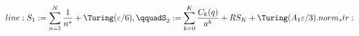 \documentclass[12pt]{article}
\begin{document}
\makeatletter
\renewcommand*{\@textcolor}[3]{%
  \protect\leavevmode
  \begingroup
    \color#1{#2}#3%
  \endgroup
}
\makeatother
\begin{displaymath}
\mathcolor[RGB]{0,0,15}{line:
S_1:=\sum_{n=1}^N\frac{1}{n^s}+\Turing(\varepsilon/6),\qquadS_2:=\sum_{k=0}^K} \mathcolor[RGB]{0,0,30}{\frac{C_k(q)}{a^k}+RS_K+\Turing(A_1\varepsilon/3).

norm_str:}
\end{displaymath}
\end{document}
